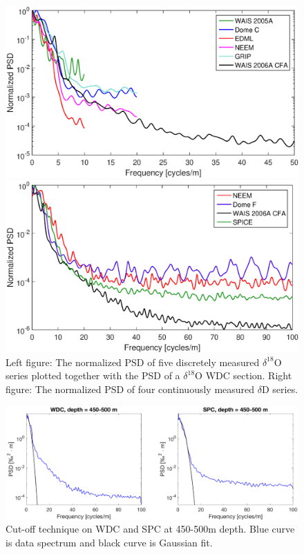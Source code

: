 \documentclass[draft, jgrga]{AGUTeX}
\begin{document}
\begin{figure}[]
	\centering
	\begin{minipage}{.5\textwidth}
		\centering
		\includegraphics[width=0.9\linewidth]{PSD_discrete_plus_cfa_v1.eps}

	\end{minipage}%
	\begin{minipage}{0.5\textwidth}
		\centering
		\indent\includegraphics[width=0.9\linewidth]{PSD_CFA_v1.eps}

	\end{minipage}
	\caption{Left figure: The normalized PSD of five discretely measured $\delta^{18}$O series plotted together with the PSD of a $\delta^{18}$O WDC section. Right figure: The normalized PSD of four continuously measured $\delta$D series.}
\label{spectra_disVScfa}
\end{figure}

\begin{figure}
	\includegraphics[width=\linewidth]{cutoff.eps}
	\caption{Cut-off technique on WDC and SPC at 450-500m depth. Blue curve is data spectrum and black curve is Gaussian fit.} \label{cutoff}
\end{figure}
\end{document}
